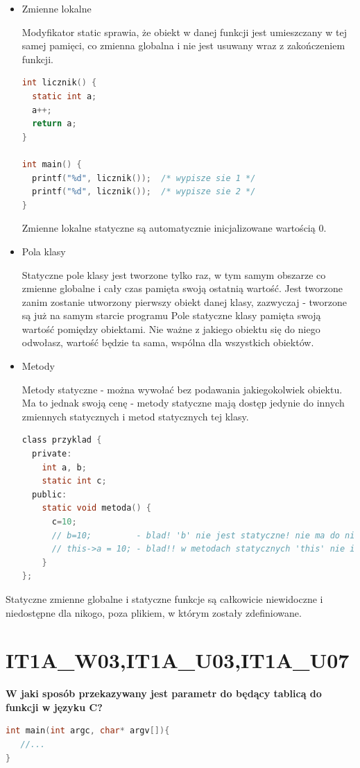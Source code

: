 \begin{itemize}
\item Zmienne lokalne

Modyfikator static sprawia, że obiekt w danej funkcji jest umieszczany w tej samej pamięci, co zmienna globalna i nie jest usuwany wraz z zakończeniem funkcji.
\begin{lstlisting}[language=c]
int licznik() {
  static int a;
  a++;
  return a;
}

int main() {
  printf("%d", licznik());  /* wypisze sie 1 */
  printf("%d", licznik());  /* wypisze sie 2 */ 
}
\end{lstlisting}

Zmienne lokalne statyczne są automatycznie inicjalizowane wartością 0.

\item Pola klasy

Statyczne pole klasy jest tworzone tylko raz, w tym samym obszarze co zmienne globalne i cały czas pamięta swoją ostatnią wartość. Jest tworzone zanim zostanie utworzony pierwszy obiekt danej klasy, zazwyczaj - tworzone są już na samym starcie programu
Pole statyczne klasy pamięta swoją wartość pomiędzy obiektami. Nie ważne z jakiego obiektu się do niego odwołasz, wartość będzie ta sama, wspólna dla wszystkich obiektów.

\item Metody

Metody statyczne - można wywołać bez podawania jakiegokolwiek obiektu. Ma to jednak swoją cenę - metody statyczne mają dostęp jedynie do innych zmiennych statycznych i metod statycznych tej klasy. 

\begin{lstlisting}[language=c]
class przyklad {
  private:
    int a, b;
    static int c;
  public:
    static void metoda() {
      c=10; 
      // b=10;         - blad! 'b' nie jest statyczne! nie ma do niego dostepu
      // this->a = 10; - blad!! w metodach statycznych 'this' nie istnieje!!
    }
};
\end{lstlisting}
\end{itemize}

Statyczne zmienne globalne i statyczne funkcje są całkowicie niewidoczne i niedostępne dla nikogo, poza plikiem, w którym zostały zdefiniowane.



\section{IT1A\_W03,IT1A\_U03,IT1A\_U07} 
\textbf{W jaki sposób przekazywany jest parametr do będący tablicą do funkcji w języku C?}
\begin{lstlisting}[language=c]
int main(int argc, char* argv[]){
   //...
}
\end{lstlisting}

